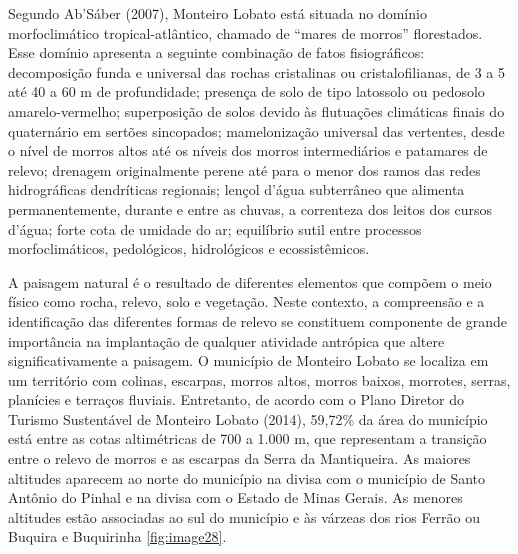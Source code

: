 Segundo Ab’Sáber (2007), Monteiro Lobato está situada no domínio morfoclimático tropical-atlântico, chamado de “mares de morros” florestados. Esse domínio apresenta a seguinte combinação de fatos fisiográficos: decomposição funda e universal das rochas cristalinas ou cristalofilianas, de 3 a 5 até 40 a 60 m de profundidade; presença de solo de tipo latossolo ou pedosolo amarelo-vermelho; superposição de solos devido às flutuações climáticas finais do quaternário em sertões sincopados; mamelonização universal das vertentes, desde o nível de morros altos até os níveis dos morros intermediários e patamares de relevo; drenagem originalmente perene até para o menor dos ramos das redes hidrográficas dendríticas regionais; lençol d’água subterrâneo que alimenta permanentemente, durante e entre as chuvas, a correnteza dos leitos dos cursos d’água; forte cota de umidade do ar; equilíbrio sutil entre processos morfoclimáticos, pedológicos, hidrológicos e ecossistêmicos.

A paisagem natural é o resultado de diferentes elementos que compõem o meio físico como rocha, relevo, solo e vegetação. Neste contexto, a compreensão e a identificação das diferentes formas de relevo se constituem componente de grande importância na implantação de qualquer atividade antrópica que altere significativamente a paisagem. O município de Monteiro Lobato se localiza em um território com colinas, escarpas, morros altos, morros baixos, morrotes, serras, planícies e terraços fluviais. Entretanto, de acordo com o Plano Diretor do Turismo Sustentável de Monteiro Lobato (2014), 59,72\% da área do município está entre as cotas altimétricas de 700 a 1.000 m, que representam a transição entre o relevo de morros e as escarpas da Serra da Mantiqueira. As maiores altitudes aparecem ao norte do município na divisa com o município de Santo Antônio do Pinhal e na divisa com o Estado de Minas Gerais. As menores altitudes estão associadas ao sul do município e às várzeas dos rios Ferrão ou Buquira e Buquirinha \autoref{fig:image28}. 

